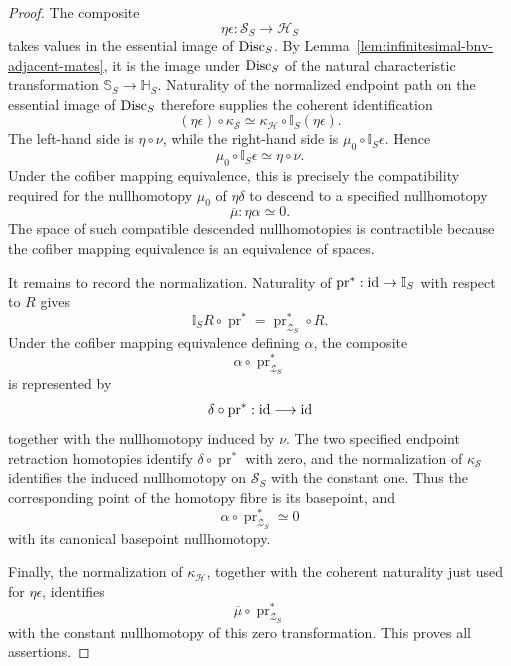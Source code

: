 \begin{proof}
The composite
\[
    \eta\epsilon:
    \mathcal S_S\longrightarrow\mathcal H_S
\]
takes values in the essential image of $\operatorname{Disc}_S$.  By
Lemma~\ref{lem:infinitesimal-bnv-adjacent-mates}, it is the image under
$\operatorname{Disc}_S$ of the natural characteristic transformation
$\mathbb S_S\to\mathbb H_S$.  Naturality of the normalized endpoint path on
the essential image of $\operatorname{Disc}_S$ therefore supplies the coherent
identification
\[
    (\eta\epsilon)\circ\kappa_{\mathcal S}
    \simeq
    \kappa_{\mathcal H}\circ
    \mathbb I_S(\eta\epsilon).
\]
The left-hand side is $\eta\circ\nu$, while the right-hand side is
$\mu_0\circ\mathbb I_S\epsilon$.  Hence
\[
    \mu_0\circ\mathbb I_S\epsilon
    \simeq
    \eta\circ\nu.
\]
Under the cofiber mapping equivalence, this is precisely the compatibility
required for the nullhomotopy $\mu_0$ of $\eta\delta$ to descend to a
specified nullhomotopy
\[
    \overline\mu:
    \eta\alpha\simeq0.
\]
The space of such compatible descended nullhomotopies is contractible because
the cofiber mapping equivalence is an equivalence of spaces.

It remains to record the normalization.  Naturality of
$\operatorname{pr}^*:\operatorname{id}\to\mathbb I_S$ with respect to $R$ gives
\[
    \mathbb I_SR\circ\operatorname{pr}^*
    =
    \operatorname{pr}^*_{\mathcal Z_S}\circ R.
\]
Under the cofiber mapping equivalence defining $\alpha$, the composite
\[
    \alpha\circ\operatorname{pr}^*_{\mathcal Z_S}
\]
is represented by
\[
    \delta\circ\operatorname{pr}^*:\operatorname{id}\longrightarrow\operatorname{id}
\]
together with the nullhomotopy induced by $\nu$.  The two specified endpoint
retraction homotopies identify
$\delta\circ\operatorname{pr}^*$ with zero, and the normalization of
$\kappa_{\mathcal S}$ identifies the induced nullhomotopy on
$\mathcal S_S$ with the constant one.  Thus the corresponding point of the
homotopy fibre is its basepoint, and
\[
    \alpha\circ\operatorname{pr}^*_{\mathcal Z_S}
    \simeq0
\]
with its canonical basepoint nullhomotopy.

Finally, the normalization of $\kappa_{\mathcal H}$, together with the
coherent naturality just used for $\eta\epsilon$, identifies
\[
    \overline\mu\circ\operatorname{pr}^*_{\mathcal Z_S}
\]
with the constant nullhomotopy of this zero transformation.  This proves all
assertions.
\end{proof}

